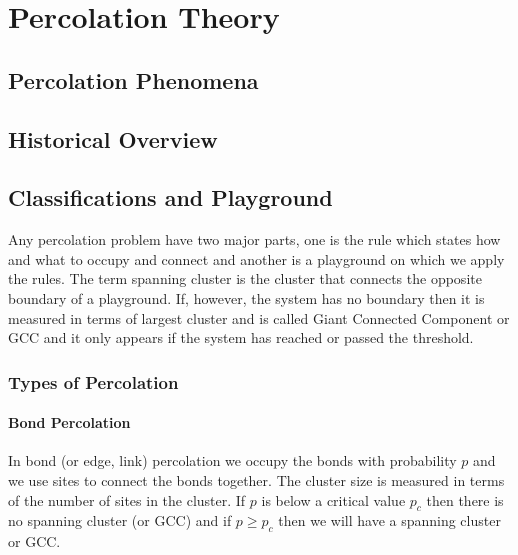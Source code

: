 \chapter{Percolation Theory}

\ifpdf
    \graphicspath{{Chapter4/Figs/}}
\else
    \graphicspath{{Chapter4/Figs/}}
\fi

\section{Percolation Phenomena}
\section{Historical Overview}
\section{Classifications and Playground}
	Any percolation problem have two major parts, one is the rule which states how and what to occupy and connect and another is a playground on which we apply the rules. The term spanning cluster is the cluster that connects the opposite boundary of a playground. If, however, the system has no boundary then it is measured in terms of largest cluster and is called Giant Connected Component or GCC and it only appears if the system has reached or passed the threshold. 
	\subsection{Types of Percolation}
		\subsubsection{Bond Percolation}
			In bond (or edge, link) percolation we occupy the bonds with probability $p$ and we use sites to connect the bonds together. The cluster size is measured in terms of the number of sites in the cluster. If $p$ is below a critical value $p_c$ then there is no spanning cluster (or GCC) and if $p \geq p_c$ then we will have a spanning cluster or GCC.

